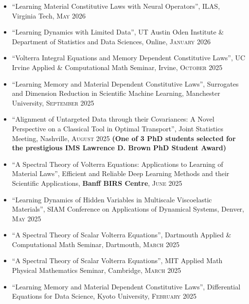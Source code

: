\documentclass[a4paper,10pt]{article}
\newcommand{\faPaperclip}{{\ResumeLinkFont\symbol{"F0C6}}}
\begin{document}
\begin{itemize}
\item ``Learning Material Constitutive Laws with Neural Operators'', ILAS, Virginia Tech, \textsc{May} 2026

\item ``Learning Dynamics with Limited Data'', UT Austin Oden Institute \& Department of Statistics and Data Sciences, Online, \textsc{January} 2026 \href{\detokenize{https://oden.utexas.edu/news-and-events/events/2200---George}\%\detokenize{20Stepaniants/}}{\faPaperclip}

\item ``Volterra Integral Equations and Memory Dependent Constitutive Laws'', UC Irvine Applied \& Computational Math Seminar, Irvine, \textsc{October} 2025

\item ``Learning Memory and Material Dependent Constitutive Laws'', Surrogates and Dimension Reduction in Scientific Machine Learning, Manchester University, \textsc{September} 2025

\item ``Alignment of Untargeted Data through their Covariances: A Novel Perspective on a Classical Tool in Optimal Transport'', Joint Statistics Meeting, Nashville, \textsc{August} 2025 \textbf{(One of 3 PhD students selected for the prestigious IMS Lawrence D. Brown PhD Student Award)} \href{\detokenize{https://imstat.org/2025/04/02/preview-george-stepaniants-ims-lawrence-d-brown-phd-student-lecture/}}{\faPaperclip}

\item ``A Spectral Theory of Volterra Equations: Applications to Learning of Material Laws'', Efficient and Reliable Deep Learning Methods and their Scientific Applications, \textbf{Banff BIRS Centre}, \textsc{June} 2025

\item ``Learning Dynamics of Hidden Variables in Multiscale Viscoelastic Materials'', SIAM Conference on Applications of Dynamical Systems, Denver, \textsc{May} 2025

\item ``A Spectral Theory of Scalar Volterra Equations'', Dartmouth Applied \& Computational Math Seminar, Dartmouth, \textsc{March} 2025

\item ``A Spectral Theory of Scalar Volterra Equations'', MIT Applied Math Physical Mathematics Seminar, Cambridge, \textsc{March} 2025

\item ``Learning Memory and Material Dependent Constitutive Laws'', Differential Equations for Data Science, Kyoto University, \textsc{February} 2025


\end{itemize}
\end{document}
